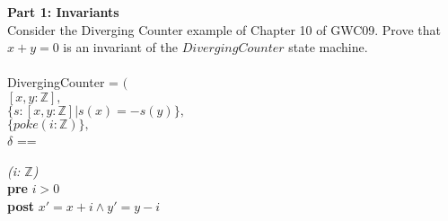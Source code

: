 \documentclass{article}
\newenvironment{spec}{
 \vspace*{8pt}
 \begin{center}
 \begin{minipage}{5in}
 \renewcommand{\baselinestretch}{1}
 }{
 \end{minipage}
 \end{center}
 \vspace*{8pt}
}
\begin{document}

\noindent \textbf{Part 1: Invariants}\\

\noindent Consider the Diverging Counter example of Chapter 10 of GWC09. Prove that $x+y=0$ is an invariant of the $DivergingCounter$ state machine.\\
\\
DivergingCounter = $($ \\
$[ x, y : \mathbb{Z} ],$ \\
$\{ s: [x, y : \mathbb{Z}] | s(x) = -s(y) \},$ \\
$\{poke(i: \mathbb{Z})\},$ \\
$\delta$ == \\

\begin{spec}
\begin{tabbing}
\={\em (i: $\mathbb{Z}$)}\\
           \> {\bf pre} $i > 0$\\
           \> {\bf post} $x' = x + i \wedge y' = y - i$
\end{tabbing}
\end{spec}
\end{document}
